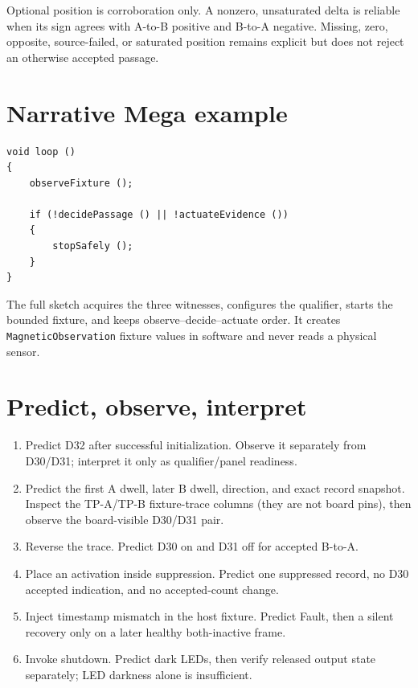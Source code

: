 \documentclass[11pt]{article}
\begin{document}
Optional position is corroboration only. A nonzero, unsaturated delta is
reliable when its sign agrees with A-to-B positive and B-to-A negative.
Missing, zero, opposite, source-failed, or saturated position remains explicit
but does not reject an otherwise accepted passage.

\section{Narrative Mega example}

\begin{lstlisting}[style=adkcpp]
void loop ()
{
    observeFixture ();

    if (!decidePassage () || !actuateEvidence ())
    {
        stopSafely ();
    }
}
\end{lstlisting}

The full sketch acquires the three witnesses, configures the qualifier, starts
the bounded fixture, and keeps observe--decide--actuate order. It creates
\texttt{MagneticObservation} fixture values in software and never reads a
physical sensor.

\section{Predict, observe, interpret}

\begin{enumerate}
  \item Predict D32 after successful initialization. Observe it separately
        from D30/D31; interpret it only as qualifier/panel readiness.
  \item Predict the first A dwell, later B dwell, direction, and exact record
        snapshot. Inspect the TP-A/TP-B fixture-trace columns (they are not
        board pins), then observe the board-visible D30/D31 pair.
  \item Reverse the trace. Predict D30 on and D31 off for accepted B-to-A.
  \item Place an activation inside suppression. Predict one suppressed record,
        no D30 accepted indication, and no accepted-count change.
  \item Inject timestamp mismatch in the host fixture. Predict Fault, then a
        silent recovery only on a later healthy both-inactive frame.
  \item Invoke shutdown. Predict dark LEDs, then verify released output state
        separately; LED darkness alone is insufficient.
\end{enumerate}
\end{document}
